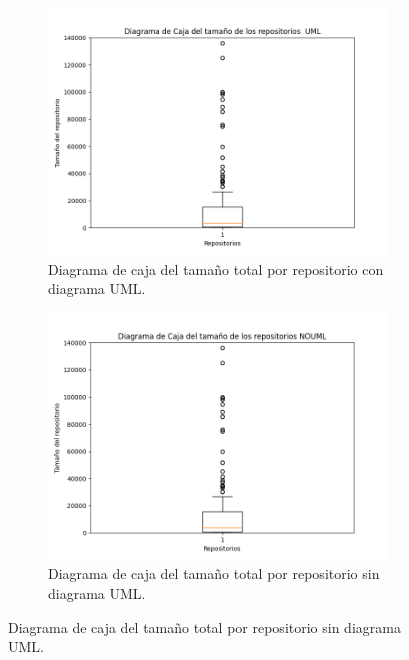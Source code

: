 \documentclass[a4paper, 12pt]{book}
\begin{document}
\begin{figure}
  \centering
  \begin{subfigure}{0.45\linewidth}
    \centering
    \includegraphics[width=9cm, keepaspectratio]{img/Figure_sizeUML.png}
    \caption{Diagrama de caja del tamaño total por repositorio con diagrama UML.}\label{fig:Figure_sizeUML}
  \end{subfigure}
  \hfill
    \begin{subfigure}{0.45\linewidth}
      \centering
      \includegraphics[width=9cm, keepaspectratio]{img/Figure_sizeNOUML.png}
      \caption{Diagrama de caja del tamaño total por repositorio sin diagrama UML.}\label{fig:Figure_sizeNOUML}
  \end{subfigure}
\end{figure}

\end{document}
